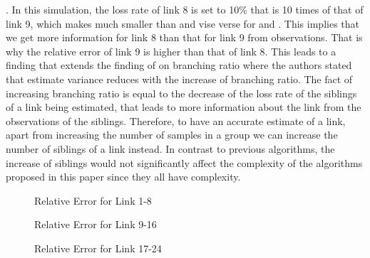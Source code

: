 \documentclass[10pt,twocolumn]{IEEEtran}
\begin{document}
\noindent \cite{Zhu06-1}. In this simulation, the loss rate of link 8
is set to 10\% that is 10 times of that of link 9, which makes
 much smaller than  and vise verse for  and
. This implies that we get more information for link 8 than
that for link 9 from observations. That is why the relative error of
link 9 is higher than that of link 8. This leads to a finding that
extends the finding of \cite{CDHT99} on branching ratio where the
authors stated that estimate variance reduces with the increase of
branching ratio. The fact of increasing branching ratio is equal to
the decrease of the loss rate of the siblings of a link being
estimated, that leads to more information about the link from the
observations of the siblings. Therefore, to have an accurate estimate
of a link, apart from increasing the number of samples in a group we
can increase the number of siblings of a link instead. In contrast to
previous algorithms, the increase of siblings would not significantly
affect the complexity of the algorithms proposed in this paper since
they all have  complexity.



\begin{figure}
\begin{center}
\caption{Relative Error for Link 1-8} \label{rel1-8}
\end{center}
\end{figure}
\begin{figure}
\begin{center}
 \caption{Relative Error for Link 9-16}
\label{rel9-16}
\end{center}
\end{figure}
\begin{figure}
\begin{center}
 \caption{Relative Error for Link 17-24}
\label{rel17-24}
\end{center}
\end{figure}
\end{document}
